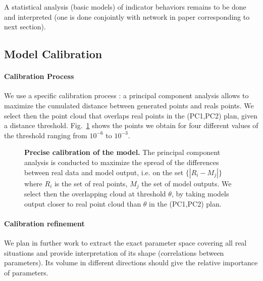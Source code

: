 \documentclass[10pt,letterpaper]{article}
\begin{document}

A statistical analysis (basic models) of indicator behaviors remains to be done and interpreted (one is done conjointly with network in paper corresponding to next section).




\subsection{Model Calibration}



\paragraph{Calibration Process}

We use a specific calibration process : a principal component analysis allows to maximize the cumulated distance between generated points and reals points. We select then the point cloud that overlaps real points in the (PC1,PC2) plan, given a distance threshold. Fig.~\ref{fig:densitycalib} shows the points we obtain for four different values of the threshold ranging from $10^{-6}$ to $10^{-3}$.




\begin{figure}
\caption[Precise calibration of the model]{\textbf{Precise calibration of the model.} The principal component analysis is conducted to maximize the spread of the differences between real data and model output, i.e. on the set $\{\left|R_i - M_j\right|\}$ where $R_i$ is the set of real points, $M_j$ the set of model outputs. We select then the overlapping cloud at threshold $\theta$, by taking models output closer to real point cloud than $\theta$ in the (PC1,PC2) plan.}
\label{fig:densitycalib}
\end{figure}





\paragraph{Calibration refinement}

We plan in further work to extract the exact parameter space covering all real situations and provide interpretation of its shape (correlations between parameters). Its volume in different directions should give the relative importance of parameters.
\end{document}
